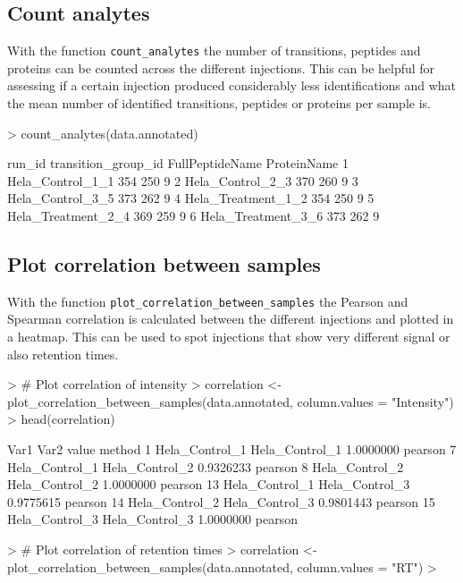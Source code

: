 \documentclass[a4paper]{article}
\begin{document}
\subsection{Count analytes}
With the function \texttt{count\_analytes} the number of transitions, peptides and proteins can be counted across the different injections. This can be helpful for assessing if a certain injection produced considerably less identifications and what the mean number of identified transitions, peptides or proteins per sample is.

\begin{Schunk}
\begin{Sinput}
> count_analytes(data.annotated)
\end{Sinput}
\begin{Soutput}
              run_id transition_group_id FullPeptideName ProteinName
1   Hela_Control_1_1                 354             250           9
2   Hela_Control_2_3                 370             260           9
3   Hela_Control_3_5                 373             262           9
4 Hela_Treatment_1_2                 354             250           9
5 Hela_Treatment_2_4                 369             259           9
6 Hela_Treatment_3_6                 373             262           9
\end{Soutput}
\end{Schunk}

\subsection{Plot correlation between samples}
With the function \texttt{plot\_correlation\_between\_samples} the Pearson and Spearman correlation is calculated between the different injections and plotted in a heatmap. This can be used to spot injections that show very different signal or also retention times.

\begin{Schunk}
\begin{Sinput}
> # Plot correlation of intensity
> correlation <- plot_correlation_between_samples(data.annotated, column.values = "Intensity")
> head(correlation)
\end{Sinput}
\begin{Soutput}
             Var1           Var2     value  method
1  Hela_Control_1 Hela_Control_1 1.0000000 pearson
7  Hela_Control_1 Hela_Control_2 0.9326233 pearson
8  Hela_Control_2 Hela_Control_2 1.0000000 pearson
13 Hela_Control_1 Hela_Control_3 0.9775615 pearson
14 Hela_Control_2 Hela_Control_3 0.9801443 pearson
15 Hela_Control_3 Hela_Control_3 1.0000000 pearson
\end{Soutput}
\begin{Sinput}
> # Plot correlation of retention times
> correlation <- plot_correlation_between_samples(data.annotated, column.values = "RT")
> 
\end{Sinput}
\end{Schunk}
\end{document}
